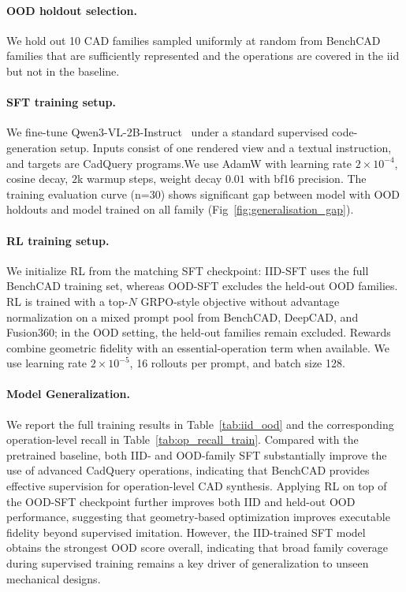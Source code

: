 \paragraph{OOD holdout selection.}
We hold out 10 CAD families sampled uniformly at random from BenchCAD families that are sufficiently represented and the operations are covered in the iid but not in the baseline.

\paragraph{SFT training setup.}
We fine-tune Qwen3-VL-2B-Instruct~\citep{Bai2025Qwen3VL} under a standard supervised code-generation setup. Inputs consist of one rendered view and a textual instruction, and targets are CadQuery programs.We use AdamW with
learning rate $2{\times}10^{-4}$, cosine decay, $2$k warmup steps, weight decay $0.01$ with bf16 precision. The training evaluation curve (n=30) shows significant gap between model with OOD holdouts and model trained on all family (Fig~\ref{fig:generalisation_gap}).

\paragraph{RL training setup.}
We initialize RL from the matching SFT checkpoint: IID-SFT uses the full BenchCAD training set, whereas OOD-SFT excludes the held-out OOD families. RL is trained with a top-$N$ GRPO-style objective without advantage normalization on a mixed prompt pool from BenchCAD, DeepCAD, and Fusion360; in the OOD setting, the held-out families remain excluded. Rewards combine geometric fidelity with an essential-operation term when available. We use learning rate $2{\times}10^{-5}$, 16 rollouts per prompt, and batch size 128.


\paragraph{Model Generalization.}
We report the full training results in Table~\ref{tab:iid_ood} and the corresponding operation-level recall in Table~\ref{tab:op_recall_train}. 
Compared with the pretrained baseline, both IID- and OOD-family SFT substantially improve the use of advanced CadQuery operations, indicating that BenchCAD provides effective supervision for operation-level CAD synthesis. 
Applying RL on top of the OOD-SFT checkpoint further improves both IID and held-out OOD performance, suggesting that geometry-based optimization improves executable fidelity beyond supervised imitation. 
However, the IID-trained SFT model obtains the strongest OOD score overall, indicating that broad family coverage during supervised training remains a key driver of generalization to unseen mechanical designs.

